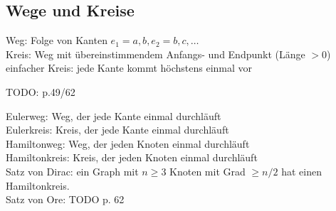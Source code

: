 \subsection{Wege und Kreise}

Weg: Folge von Kanten $e_1={a,b},e_2={b,c},\dots$
\\
Kreis: Weg mit übereinstimmendem Anfangs- und Endpunkt (Länge $>0$)
\\
einfacher Kreis: jede Kante kommt höchstens einmal vor

TODO: p.49/62

Eulerweg: Weg, der jede Kante einmal durchläuft
\\
Eulerkreis: Kreis, der jede Kante einmal durchläuft
\\
Hamiltonweg: Weg, der jeden Knoten einmal durchläuft
\\
Hamiltonkreis: Kreis, der jeden Knoten einmal durchläuft
\\
Satz von Dirac: ein Graph mit $n \geq 3$ Knoten mit Grad $\geq n/2$ hat einen Hamiltonkreis.
\\
Satz von Ore: TODO p. 62
